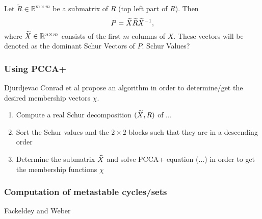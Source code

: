 \begin{defi}
Let $\widetilde{R} \in \mathbb{R}^{m \times m}$ be a submatrix of $R$ (top left part of $R$). Then
\begin{equation*}
P = \widetilde{X} \widetilde{R} \widetilde{X}^{-1},
\end{equation*}
where $\widetilde{X} \in \mathbb{R}^{n \times m}$ consists of the first $m$ columns of $X$. These vectors will be denoted as the dominant Schur Vectors of $P$.  Schur Values?
\end{defi}

\subsubsection*{Using PCCA+}
Djurdjevac Conrad et al\cite{djur2016} propose an algorithm in order to determine/get the desired membership vectors $\chi$.
\begin{enumerate}
\item Compute a real Schur decomposition $(\widetilde{X}, R)$ of ...
\item Sort the Schur values and the $2 \times 2$-blocks such that they are in a descending order
\item Determine the submatrix $\widehat{X}$ and solve PCCA+ equation (...) in order to get the membership functions $\chi$
\end{enumerate}

\subsubsection*{Computation of metastable cycles/sets}

Fackeldey and Weber\cite{fackeldey2017gen}
